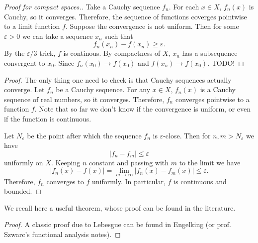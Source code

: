 
\begin{proof}[Proof for compact spaces.]
Take a Cauchy sequence \( f_n \). For each \( x \in X \), \( f_n(x) \) is Cauchy, so it converges. Therefore, the sequence of functions coverges pointwise to a limit function \( f \). Suppose the convergence is not uniform. Then for some \(\varepsilon > 0 \) we can take a sequence \( x_n \) such that
\[ 
    f_n(x_n) - f(x_n) \geqslant \varepsilon. 
\]
By the \(\varepsilon/3 \) trick, \( f \) is continous. By compactness of \( X \), \( x_n \) has a subsequence convergent to \( x_0 \). Since \( f_n(x_0) \to f(x_0) \) and \( f(x_n) \to f(x_0) \). TODO!
\end{proof}

\begin{proof}
The only thing one need to check is that Cauchy sequences actually converge. Let \( f_n \) be a Cauchy sequence. For any \( x \in X \), \( f_n(x) \) is a Cauchy sequence of real numbers, so it converges. Therefore, \( f_n \) converges pointwise to a function \( f \). Note that so far we don't know if the convergence is uniform, or even if the function is continuous.

Let \( N_{\varepsilon } \) be the point after which the sequence \( f_n \) is \(\varepsilon \)-close. Then for \( n, m > N_{\varepsilon } \) we have
\[ 
    \left| f_n - f_m \right| \leqslant \varepsilon
\]
uniformly on \( X \). Keeping \( n \) constant and passing with \( m \) to the limit we have
\[ 
    \left| f_n(x) - f(x) \right| = \lim_{m \to \infty} \left| f_n(x) - f_m(x) \right| \leqslant\varepsilon.
\]
Therefore, \( f_n  \) converges to \( f \) uniformly. In particular, \( f \) is continuous and bounded.
\end{proof}

We recall here a useful theorem, whose proof can be found in the literature.

\begin{proof}
A classic proof due to Lebesgue can be found in Engelking (or prof. Szwarc's functional analysis notes).
\end{proof}

